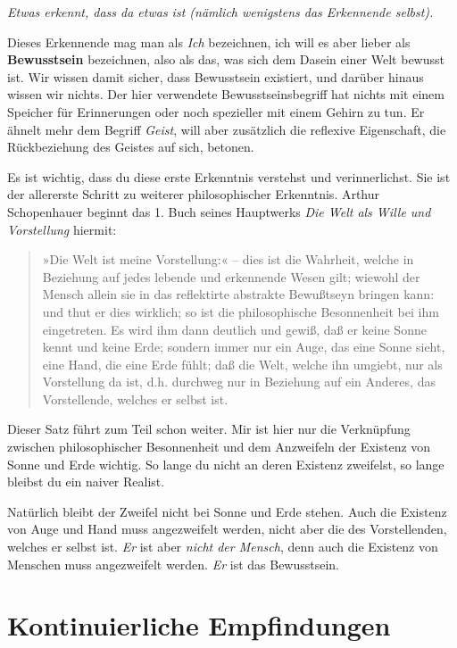 \documentclass[12pt]{book}
\begin{document}
\textit{Etwas erkennt, dass da etwas ist (nämlich wenigstens das Erkennende selbst).}

Dieses Erkennende mag man als \textit{Ich} bezeichnen, ich will es aber lieber als \textbf{Bewusstsein} bezeichnen, also als das, was sich dem Dasein einer Welt bewusst ist. Wir wissen damit sicher, dass Bewusstsein existiert, und darüber hinaus wissen wir nichts. Der hier verwendete Bewusstseinsbegriff hat nichts mit einem Speicher für Erinnerungen oder noch spezieller mit einem Gehirn zu tun. Er ähnelt mehr dem Begriff \textit{Geist}, will aber zusätzlich die reflexive Eigenschaft, die Rückbeziehung des Geistes auf sich, betonen. 

Es ist wichtig, dass du diese erste Erkenntnis verstehst und verinnerlichst. Sie ist der allererste Schritt zu weiterer philosophischer Erkenntnis. Arthur Schopenhauer beginnt das 1. Buch seines Hauptwerks \textit{Die Welt als Wille und Vorstellung} hiermit: 

\begin{quote}\begin{tcolorbox}
»Die Welt ist meine Vorstellung:« – dies ist die Wahrheit, welche in Beziehung auf jedes lebende und erkennende Wesen gilt; wiewohl der Mensch allein sie in das reflektirte abstrakte Bewußtseyn bringen kann: und thut er dies wirklich; so ist die philosophische Besonnenheit bei ihm eingetreten. Es wird ihm dann deutlich und gewiß, daß er keine Sonne kennt und keine Erde; sondern immer nur ein Auge, das eine Sonne sieht, eine Hand, die eine Erde fühlt; daß die Welt, welche ihn umgiebt, nur als Vorstellung da ist, d.h. durchweg nur in Beziehung auf ein Anderes, das Vorstellende, welches er selbst ist.
\end{tcolorbox}\end{quote}

Dieser Satz führt zum Teil schon weiter. Mir ist hier nur die Verknüpfung zwischen philosophischer Besonnenheit und dem Anzweifeln der Existenz von Sonne und Erde wichtig. So lange du nicht an deren Existenz zweifelst, so lange bleibst du ein naiver Realist. 

Natürlich bleibt der Zweifel nicht bei Sonne und Erde stehen. Auch die Existenz von Auge und Hand muss angezweifelt werden, nicht aber die des Vorstellenden, welches er selbst ist. \textit{Er} ist aber \textit{nicht der Mensch}, denn auch die Existenz von Menschen muss angezweifelt werden. \textit{Er} ist das Bewusstsein.

\section{Kontinuierliche Empfindungen}
\end{document}
